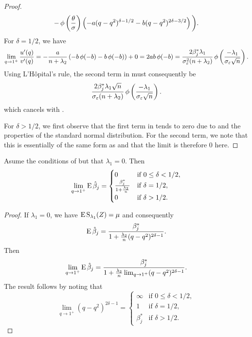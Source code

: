 \begin{proof}
\begin{multline}
    - \operatorname{\phi}\left(\frac{\theta}{\sigma}\right) \left(-a(q - q^2)^{\delta - 1/2} - b(q - q^2)^{2\delta - 3/2}\right) \bigg).
  \end{multline}
  For \(\delta = 1/2\), we have
  \[
    \lim_{q \rightarrow 1^+} \frac{u'(q)}{v'(q)} = -\frac{a}{n + \lambda_2}\left(-b \operatorname{\phi}(-b) - b \operatorname{\phi}(-b)\right) + 0 = 2ab \operatorname{\phi}(-b) = \frac{2 \beta_j^* \lambda_1}{\sigma_\varepsilon^2(n + \lambda_2)} \operatorname{\phi} \left(\frac{-\lambda_1}{\sigma_\varepsilon\sqrt{n}}\right).
  \]
  Using L'Hôpital's rule, the second term in  must consequently be
  \[
    \frac{2 \beta_j^* \lambda_1\sqrt{n}}{\sigma_\varepsilon(n + \lambda_2)} \operatorname{\phi} \left(\frac{-\lambda_1}{\sigma_\varepsilon\sqrt{n}}\right).
  \]
  which cancels with .

  For \(\delta > 1/2\), we first observe that the first term in  tends to zero due to  and
  the properties of the standard normal distribution. For the second term, we note that this is essentially
  of the same form as  and that the limit is therefore 0 here.
\end{proof}

\begin{corollary}
  Asume the conditions of  but that \(\lambda_1 = 0\). Then
  \[
    \lim_{q \rightarrow 1^+} \operatorname{E} \hat{\beta}_j =
    \begin{cases}
      0                                         & \text{if } 0 \leq \delta < 1/2, \\
      \frac{\beta_j^*}{1 + \frac{\lambda_2}{n}} & \text{if } \delta = 1/2,        \\
      0                                         & \text{if } \delta > 1/2.
    \end{cases}
  \]
\end{corollary}
\begin{proof}
  If \(\lambda_1 = 0\), we have \(\operatorname{E} \operatorname{S}_{\lambda_1}(Z) = \mu\) and consequently
  \[
    \operatorname{E} \hat{\beta}_j = \frac{\beta_j^*}{1 + \frac{\lambda_2}{n} (q - q^2)^{2\delta - 1}}.
  \]
  Then
  \[
    \lim_{q \rightarrow 1^+} \operatorname{E} \hat{\beta}_j = \frac{\beta_j^*}{1 + \frac{\lambda_2}{n}\lim_{q \rightarrow 1^+} (q - q^2)^{2\delta - 1}}.
  \]
  The result follows by noting that
  \[
    \lim_{q \rightarrow 1^+} (q - q^2)^{2\delta - 1} =
    \begin{cases}
      \infty    & \text{if } 0 \leq \delta < 1/2, \\
      1         & \text{if } \delta = 1/2,        \\
      \beta_j^* & \text{if } \delta > 1/2.
    \end{cases}
  \]
\end{proof}

